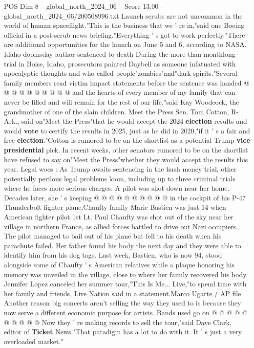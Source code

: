 \begin{textsample}{POS Dim 8 – global\_north\_2024\_06 – Score 13.00 – global\_north\_2024\_06/200508996.txt}
Launch scrubs are not uncommon in the world of human spaceflight."This is the business that we ' re in,"said one Boeing official in a post-scrub news briefing."Everything ' s got to work perfectly."There are additional opportunities for the launch on June 5 and 6, according to NASA.
Idaho doomsday author sentenced to death During the more than monthlong trial in Boise, Idaho, prosecutors painted Daybell as someone infatuated with apocalyptic thoughts and who called people"zombies"and"dark spirits."Several family members read victim impact statements before the sentence was handed @ @ @ @ @ @ @ @ @ @ and the hearts of every member of my family that can never be filled and will remain for the rest of our life,"said Kay Woodcock, the grandmother of one of the slain children.
Meet the Press Sen.
Tom Cotton, R-Ark., said on"Meet the Press"that he would accept the 2024 \textbf{election} results and would \textbf{vote} to certify the results in 2025, just as he did in 2020,"if it ' s a fair and free \textbf{election}."Cotton is rumored to be on the shortlist as a potential Trump \textbf{vice} \textbf{presidential} pick.
In recent weeks, other senators rumored to be on the shortlist have refused to say on"Meet the Press"whether they would accept the results this year.
Legal woes : As Trump awaits sentencing in the hush money trial, other potentially perilous legal problems loom, including up to three criminal trials where he faces more serious charges.
A pilot was shot down near her home.
Decades later, she ' s keeping @ @ @ @ @ @ @ @ @ @ in the cockpit of his P-47 Thunderbolt fighter plane.Chaufty family Marie Bastien was just 14 when American fighter pilot 1st Lt.
Paul Chaufty was shot out of the sky near her village in northern France, as allied forces battled to drive out Nazi occupiers.
The pilot managed to bail out of his plane but fell to his death when his parachute failed.
Her father found his body the next day and they were able to identify him from his dog tags.
Last week, Bastien, who is now 94, stood alongside some of Chaufty ' s American relatives while a plaque honoring his memory was unveiled in the village, close to where her family recovered his body.
Jennifer Lopez canceled her summer tour,"This Is Me...
Live,"to spend time with her family and friends, Live Nation said in a statement.Marco Ugarte / AP file Another reason big concerts aren't selling the way they used to is because they now serve a different economic purpose for artists.
Bands used go on @ @ @ @ @ @ @ @ @ @ Now they ' re making records to sell the tour,"said Dave Clark, editor of \textbf{Ticket} News."That paradigm has a lot to do with it.
It ' s just a very overloaded market."

\end{textsample}
